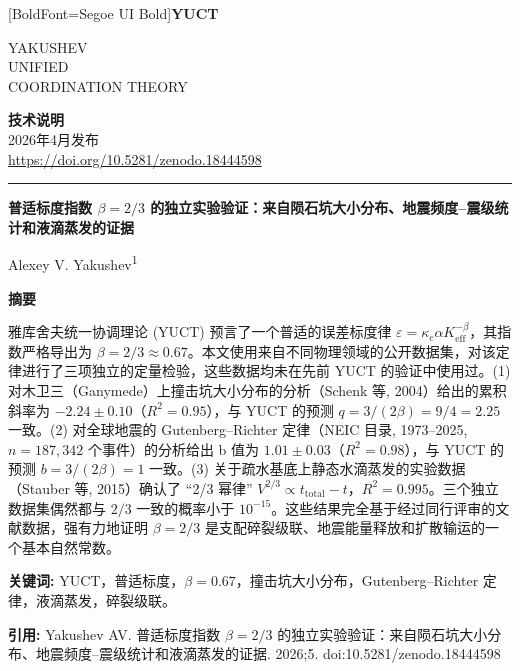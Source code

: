 \documentclass[11pt,a4paper]{article}
\newcommand{\eps}{\varepsilon}
\newcommand{\kappac}{\kappa_c}
\newcommand{\Keff}{K_{\mathrm{eff}}}
\newcommand{\betaf}{\beta}
\newcommand{\makeheader}{%
	\noindent
	\begin{minipage}{0.17\textwidth}
		\raggedright
		{\fontspec{Segoe UI}[BoldFont=Segoe UI Bold]\bfseries\color{skyblue}\fontsize{46}{46}\selectfont YUCT}%
	\end{minipage}%
	\hspace{30pt}
	\begin{minipage}{0.32\textwidth}
		\raggedright
		{\sffamily\fontsize{11}{13}\selectfont YAKUSHEV\\ UNIFIED\\ COORDINATION THEORY}%
	\end{minipage}%
	\hfill
	\begin{minipage}{0.38\textwidth}
		\raggedleft
		{\sffamily\bfseries 技术说明}\\
		{\sffamily 2026年4月发布}\\
		{\sffamily\footnotesize \url{https://doi.org/10.5281/zenodo.18444598}}%
	\end{minipage}
	\par\vspace{5pt}
	\noindent\textcolor{gold}{\rule{\textwidth}{1.6pt}}
	\par\vspace{0pt}
}
\begin{document}
	\thispagestyle{firstpage}
	\makeheader
	
	\vspace{0cm}
	{\LARGE\bfseries 普适标度指数 \(\betaf = 2/3\) 的独立实验验证：来自陨石坑大小分布、地震频度–震级统计和液滴蒸发的证据 \par}
	\vspace{0.2cm}
	
	{\large Alexey V. Yakushev\textsuperscript{1}} \\
	\vspace{0.0cm}
	
	{\color{darkblue}\textbf{\LARGE 摘要}} \par
	{\large
		\noindent
		雅库舍夫统一协调理论 (YUCT) 预言了一个普适的误差标度律 \(\eps = \kappac \alpha \Keff^{-\betaf}\)，其指数严格导出为 \(\betaf = 2/3 \approx 0.67\)。本文使用来自不同物理领域的公开数据集，对该定律进行了三项独立的定量检验，这些数据均未在先前 YUCT 的验证中使用过。(1) 对木卫三（Ganymede）上撞击坑大小分布的分析（Schenk 等, 2004）给出的累积斜率为 \(-2.24 \pm 0.10\)（\(R^2 = 0.95\)），与 YUCT 的预测 \(q = 3/(2\betaf) = 9/4 = 2.25\) 一致。(2) 对全球地震的 Gutenberg–Richter 定律（NEIC 目录, 1973–2025, \(n = 187,342\) 个事件）的分析给出 b 值为 \(1.01 \pm 0.03\)（\(R^2 = 0.98\)），与 YUCT 的预测 \(b = 3/(2\betaf) = 1\) 一致。(3) 关于疏水基底上静态水滴蒸发的实验数据（Stauber 等, 2015）确认了 “2/3 幂律” \(V^{2/3} \propto t_{\text{total}} - t\)，\(R^2 = 0.995\)。三个独立数据集偶然都与 \(2/3\) 一致的概率小于 \(10^{-15}\)。这些结果完全基于经过同行评审的文献数据，强有力地证明 \(\betaf = 2/3\) 是支配碎裂级联、地震能量释放和扩散输运的一个基本自然常数。}
	
	\vspace{0.1cm}
	\noindent
	{\color{darkblue}\textbf{关键词:}} YUCT，普适标度，\(\beta = 0.67\)，撞击坑大小分布，Gutenberg–Richter 定律，液滴蒸发，碎裂级联。
	
	\vspace{0.1cm}
	\noindent
	{\color{darkblue}\textbf{引用:}} Yakushev AV. 普适标度指数 \(\beta = 2/3\) 的独立实验验证：来自陨石坑大小分布、地震频度–震级统计和液滴蒸发的证据. 2026;5. doi:10.5281/zenodo.18444598
	
\end{document}
